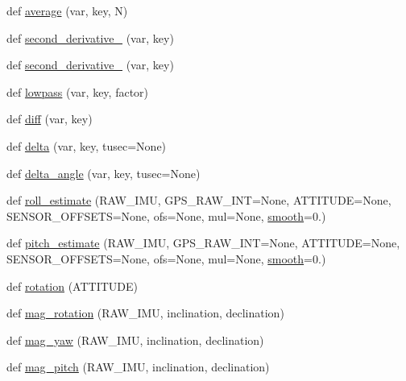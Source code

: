 \begin{DoxyCompactItemize}
\item 
def \mbox{\hyperlink{namespacepymavlink_1_1mavextra_a3953775074e771143256576a19fab8d3}{average}} (var, key, N)
\item 
def \mbox{\hyperlink{namespacepymavlink_1_1mavextra_aaee8500fc795534b56fc2ba040dafb4d}{second\+\_\+derivative\+\_}} (var, key)
\item 
def \mbox{\hyperlink{namespacepymavlink_1_1mavextra_a47da2a88a30ba6ca85072ffa2eabd255}{second\+\_\+derivative\+\_}} (var, key)
\item 
def \mbox{\hyperlink{namespacepymavlink_1_1mavextra_ae160af64a51d6e6c620fc12450857585}{lowpass}} (var, key, factor)
\item 
def \mbox{\hyperlink{namespacepymavlink_1_1mavextra_ab3215121238bdf76cb714ad349d6a17b}{diff}} (var, key)
\item 
def \mbox{\hyperlink{namespacepymavlink_1_1mavextra_a551bb6b34664f22c30ff4eb6342bfd64}{delta}} (var, key, tusec=None)
\item 
def \mbox{\hyperlink{namespacepymavlink_1_1mavextra_a96f32826ccd7a2296e5bb5664d77a9ce}{delta\+\_\+angle}} (var, key, tusec=None)
\item 
def \mbox{\hyperlink{namespacepymavlink_1_1mavextra_a1a001cccb29771aea954d733377c92f9}{roll\+\_\+estimate}} (R\+A\+W\+\_\+\+I\+MU, G\+P\+S\+\_\+\+R\+A\+W\+\_\+\+I\+NT=None, A\+T\+T\+I\+T\+U\+DE=None, S\+E\+N\+S\+O\+R\+\_\+\+O\+F\+F\+S\+E\+TS=None, ofs=None, mul=None, \mbox{\hyperlink{nightmare_8c_acd159186e193428cba70578a92bafed2}{smooth}}=0.)
\item 
def \mbox{\hyperlink{namespacepymavlink_1_1mavextra_a571222d19bb4574669698dcb01912fb7}{pitch\+\_\+estimate}} (R\+A\+W\+\_\+\+I\+MU, G\+P\+S\+\_\+\+R\+A\+W\+\_\+\+I\+NT=None, A\+T\+T\+I\+T\+U\+DE=None, S\+E\+N\+S\+O\+R\+\_\+\+O\+F\+F\+S\+E\+TS=None, ofs=None, mul=None, \mbox{\hyperlink{nightmare_8c_acd159186e193428cba70578a92bafed2}{smooth}}=0.)
\item 
def \mbox{\hyperlink{namespacepymavlink_1_1mavextra_a28d2ae204e94f85443cb66a3f4231d80}{rotation}} (A\+T\+T\+I\+T\+U\+DE)
\item 
def \mbox{\hyperlink{namespacepymavlink_1_1mavextra_a55bf2db7a98272c74d86e6e721afddb1}{mag\+\_\+rotation}} (R\+A\+W\+\_\+\+I\+MU, inclination, declination)
\item 
def \mbox{\hyperlink{namespacepymavlink_1_1mavextra_aa2959db40d0a944e4b7f46e3128df872}{mag\+\_\+yaw}} (R\+A\+W\+\_\+\+I\+MU, inclination, declination)
\item 
def \mbox{\hyperlink{namespacepymavlink_1_1mavextra_a34628d19d224246f6da064562dc71b85}{mag\+\_\+pitch}} (R\+A\+W\+\_\+\+I\+MU, inclination, declination)

\end{DoxyCompactItemize}

